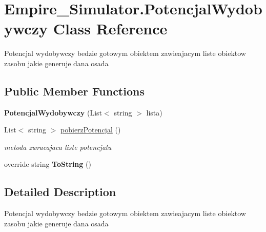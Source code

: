 \hypertarget{class_empire___simulator_1_1_potencjal_wydobywczy}{\section{Empire\+\_\+\+Simulator.\+Potencjal\+Wydobywczy Class Reference}
\label{class_empire___simulator_1_1_potencjal_wydobywczy}
}


Potencjal wydobywczy bedzie gotowym obiektem zawieajacym liste obiektow zasobu jakie generuje dana osada  


\subsection*{Public Member Functions}
\begin{DoxyCompactItemize}
\item 
\hypertarget{class_empire___simulator_1_1_potencjal_wydobywczy_a2db65c9ca35009c3cf62b6fd7b60f9a8}{{\bfseries Potencjal\+Wydobywczy} (List$<$ string $>$ lista)}\label{class_empire___simulator_1_1_potencjal_wydobywczy_a2db65c9ca35009c3cf62b6fd7b60f9a8}

\item 
List$<$ string $>$ \hyperlink{class_empire___simulator_1_1_potencjal_wydobywczy_a8f5c8a2011d8a2c846cf5ec64c8c1f75}{pobierz\+Potencjal} ()
\begin{DoxyCompactList}\small\item\em metoda zwracajaca liste potencjalu \end{DoxyCompactList}\item 
\hypertarget{class_empire___simulator_1_1_potencjal_wydobywczy_ae54d0ffe93497d5d210fc1f635d8d348}{override string {\bfseries To\+String} ()}\label{class_empire___simulator_1_1_potencjal_wydobywczy_ae54d0ffe93497d5d210fc1f635d8d348}

\end{DoxyCompactItemize}


\subsection{Detailed Description}
Potencjal wydobywczy bedzie gotowym obiektem zawieajacym liste obiektow zasobu jakie generuje dana osada 



